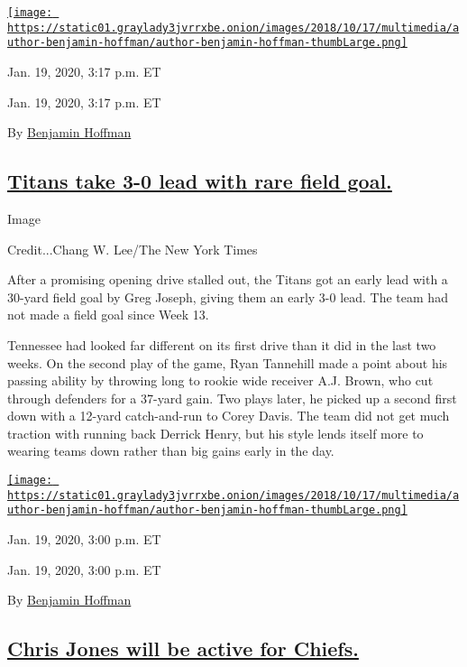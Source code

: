 \href{https://www.nytimes3xbfgragh.onion/by/benjamin-hoffman}{\texttt{[image: https://static01.graylady3jvrrxbe.onion/images/2018/10/17/multimedia/author-benjamin-hoffman/author-benjamin-hoffman-thumbLarge.png]}}

Jan. 19, 2020, 3:17 p.m. ET

Jan. 19, 2020, 3:17 p.m. ET

By
\href{https://www.nytimes3xbfgragh.onion/by/benjamin-hoffman}{Benjamin
Hoffman}

\hypertarget{titans-take-3-0-lead-with-rare-field-goal}{%
\subsection{\texorpdfstring{\protect\hyperlink{titans-take-3-0-lead-with-rare-field-goal}{Titans
take 3-0 lead with rare field
goal.}}{Titans take 3-0 lead with rare field goal.}}\label{titans-take-3-0-lead-with-rare-field-goal}}

Image

Credit...Chang W. Lee/The New York Times

After a promising opening drive stalled out, the Titans got an early
lead with a 30-yard field goal by Greg Joseph, giving them an early 3-0
lead. The team had not made a field goal since Week 13.

Tennessee had looked far different on its first drive than it did in the
last two weeks. On the second play of the game, Ryan Tannehill made a
point about his passing ability by throwing long to rookie wide receiver
A.J. Brown, who cut through defenders for a 37-yard gain. Two plays
later, he picked up a second first down with a 12-yard catch-and-run to
Corey Davis. The team did not get much traction with running back
Derrick Henry, but his style lends itself more to wearing teams down
rather than big gains early in the day.

\href{https://www.nytimes3xbfgragh.onion/by/benjamin-hoffman}{\texttt{[image: https://static01.graylady3jvrrxbe.onion/images/2018/10/17/multimedia/author-benjamin-hoffman/author-benjamin-hoffman-thumbLarge.png]}}

Jan. 19, 2020, 3:00 p.m. ET

Jan. 19, 2020, 3:00 p.m. ET

By
\href{https://www.nytimes3xbfgragh.onion/by/benjamin-hoffman}{Benjamin
Hoffman}

\hypertarget{chris-jones-will-be-active-for-chiefs}{%
\subsection{\texorpdfstring{\protect\hyperlink{chris-jones-will-be-active-for-chiefs}{Chris
Jones will be active for
Chiefs.}}{Chris Jones will be active for Chiefs.}}\label{chris-jones-will-be-active-for-chiefs}}

